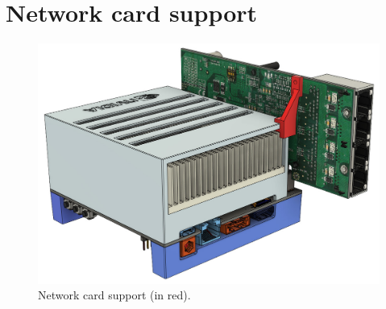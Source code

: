\section{Network card support}

\begin{figure}[H]
    \centering
    \includegraphics[width=\textwidth]{figures/3d_print/support.jpg}
    \caption{Network card support (in red).}
    \label{fig:network_card_support}
\end{figure}